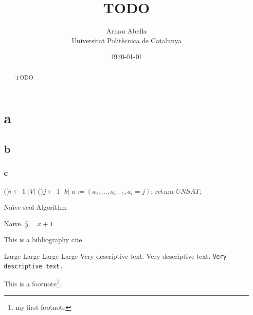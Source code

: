 \documentclass[12pt, a4paper]{article} %
\title{%
  TODO
}
\author{%
  Arnau Abella \\
  \large{Universitat Polit\`ecnica de Catalunya}
}
\date{\today}
\begin{document}
\maketitle

\tableofcontents

\begin{abstract}
\noindent
  TODO
\end{abstract}


\section{a}\label{a}

\subsection{b}\label{b}

\subsubsection{c}\label{c}

\begin{algorithm}[H]
  \SetAlgoNoLine
  \BlankLine
  \For(){$i \leftarrow 1$ \KwTo $|V|$}{
    \For(){$j \leftarrow 1$ \KwTo $|k|$}{
      $a := (a_1,\dots,a_{i-1}, a_i = j)$;
    }
  }
  return $UNSAT$;
  \caption{Na\"ive \acrshort{scol} Algorithm}
  \label{scol}
\end{algorithm}

\newpage

Na\"ive. $\hat{y} = x + 1$

This is a bibliography cite\cite{einstein}.

{\tiny Large}
{\scriptsize Large}
{\footnotesize Large}
{\small Large}
{\large \textrm{Very descriptive text.}}
{\large \textsf{Very descriptive text.}}
{\large \texttt{Very descriptive text.}}

This is a footnote\footnote{my first footnote}.
\end{document}
